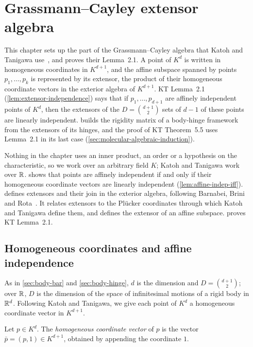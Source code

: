 \section{Grassmann--Cayley extensor algebra}
\label{sec:molecular}

This chapter sets up the part of the Grassmann--Cayley algebra that
Katoh and Tanigawa use~\cite[\S2.1]{katohTanigawa2011}, and proves
their Lemma~2.1. A point of $K^d$ is written in homogeneous coordinates
in $K^{d+1}$, and the affine subspace spanned by points
$p_1, \dots, p_k$ is represented by its extensor, the product of their
homogeneous coordinate vectors in the exterior algebra of $K^{d+1}$.
KT Lemma~2.1 (\cref{lem:extensor-independence}) says that if
$p_1, \dots, p_{d+1}$ are affinely independent points of $K^d$, then
the extensors of the $D = \binom{d+1}{2}$ sets of $d-1$ of these
points are linearly independent.
 builds the rigidity matrix of a
body-hinge framework from the extensors of its hinges, and the proof of
KT Theorem~5.5 uses Lemma~2.1 in its last case
(\cref{sec:molecular-algebraic-induction}).

Nothing in the chapter uses an inner product, an order or a hypothesis
on the characteristic, so we work over an arbitrary field $K$; Katoh
and Tanigawa work over ${\mathbb{R}}$.  shows that
points are affinely independent if and only if their homogeneous
coordinate vectors are linearly independent
(\cref{lem:affine-indep-iff}).  defines
extensors and their join in the exterior algebra, following Barnabei,
Brini and Rota~\cite{barnabeiBriniRota1985}. It relates extensors to
the Plücker coordinates through which Katoh and Tanigawa define them,
and defines the extensor of an affine subspace.
 proves KT Lemma~2.1.

\subsection{Homogeneous coordinates and affine independence}
\label{sec:molecular-homog}

As in \cref{sec:body-bar} and \cref{sec:body-hinge}, $d$ is the
dimension and $D = \binom{d+1}{2}$; over ${\mathbb{R}}$, $D$ is the dimension of
the space of infinitesimal motions of a rigid body in ${\mathbb{R}}^d$. Following
Katoh and Tanigawa, we give each point of $K^d$ a homogeneous
coordinate vector in $K^{d+1}$.

\begin{definition}
  \label{def:homogeneous-coords}
  \leanok
  Let $p \in K^d$. The \emph{homogeneous coordinate vector} of $p$ is
  the vector $\bar p = (p, 1) \in K^{d+1}$, obtained by appending the
  coordinate $1$.
\end{definition}

